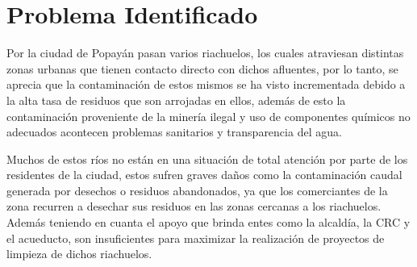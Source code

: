 \section{Problema Identificado}
  Por la ciudad de Popayán pasan varios riachuelos, los cuales atraviesan distintas zonas urbanas que tienen contacto directo con dichos afluentes, por lo tanto, se aprecia que la contaminación de estos mismos se ha visto incrementada debido a la alta tasa de residuos que son arrojadas en ellos, además de esto la contaminación proveniente de la minería ilegal y uso de componentes químicos no adecuados acontecen problemas sanitarios y transparencia del agua.

  Muchos de estos ríos no están en una situación de total atención por parte de los residentes de la ciudad, estos sufren graves daños como la contaminación caudal generada por desechos o residuos abandonados, ya que los comerciantes de la zona recurren a desechar sus residuos en las zonas cercanas a los riachuelos. Además teniendo en cuanta el apoyo que brinda entes como la alcaldía, la CRC y el acueducto, son insuficientes para maximizar la realización de proyectos de limpieza de dichos riachuelos.
